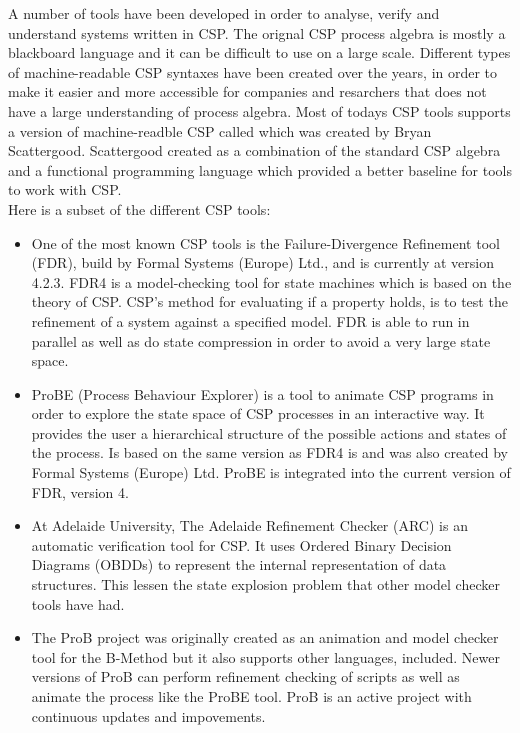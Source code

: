 A number of tools have been developed in order to analyse, verify and understand systems written in CSP. The orignal CSP process algebra is mostly a blackboard language and it can be difficult to use on a large scale. Different types of machine-readable CSP syntaxes have been created over the years, in order to make it easier and more accessible for companies and resarchers that does not have a large understanding of process algebra. Most of todays CSP tools supports a version of machine-readble CSP called \cspm{} which was created by Bryan Scattergood\cite{Scattergood1998}. Scattergood created \cspm{} as a combination of the standard CSP algebra and a functional programming language which provided a better baseline for tools to work with CSP.\\
Here is a subset of the different CSP tools:
\begin{itemize}
\item One of the most known CSP tools is the Failure-Divergence Refinement tool (FDR), build by Formal Systems (Europe) Ltd., and is currently at version 4.2.3\cite{fdr}. FDR4 is a model-checking tool for state machines which is based on the theory of CSP. CSP's method for evaluating if a property holds, is to test the refinement of a system against a specified model.
FDR is able to run in parallel as well as do state compression in order to avoid a very large state space.
\item ProBE (Process Behaviour Explorer)\cite{probe} is a tool to animate CSP programs in order to explore the state space of CSP processes in an interactive way. It provides the user a hierarchical structure of the possible actions and states of the process.
Is based on the same \cspm{}  version as FDR4 is and was also created by Formal Systems (Europe) Ltd. ProBE is integrated into the current version of FDR, version 4.
\item At Adelaide University, The Adelaide Refinement Checker (ARC)\cite{Parashkevov1996} is an automatic verification tool for CSP. It uses Ordered Binary Decision Diagrams (OBDDs) to represent the internal representation of data structures. This lessen the state explosion problem that other model checker tools have had.
\item The ProB project\cite{ProB}\cite{Leuschel2003} was originally created as an animation and model checker tool for the B-Method\cite{Abrial1988} but it also supports other languages, \cspm{}  included. Newer versions of ProB can perform refinement checking of \cspm{}  scripts as well as animate the process like the ProBE tool. ProB is an active project with continuous updates and impovements.

\end{itemize}
